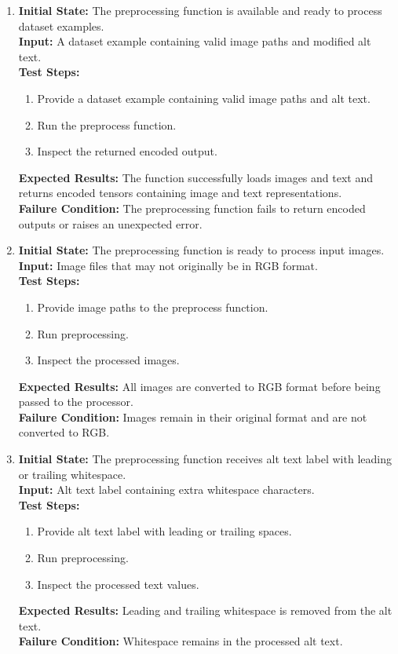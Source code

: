 \documentclass[12pt, titlepage]{article}
\begin{document}
\begin{enumerate}[label=DP-MT \arabic*., wide=0pt, leftmargin=*]
  \item{}
    {\bf Initial State:} The preprocessing function is available and
    ready to process dataset examples. \\
    {\bf Input:} A dataset example containing valid image paths and
    modified alt text. \\
    {\bf Test Steps:}
    \begin{enumerate}
      \item Provide a dataset example containing valid image paths and alt text.
      \item Run the preprocess function.
      \item Inspect the returned encoded output.
    \end{enumerate}
    {\bf Expected Results:} The function successfully loads images
    and text and returns encoded tensors containing image and text
    representations. \\
    {\bf Failure Condition:} The preprocessing function fails to
    return encoded outputs or raises an unexpected error. \\

  \item{}
    {\bf Initial State:} The preprocessing function is ready to
    process input images. \\
    {\bf Input:} Image files that may not originally be in RGB format. \\
    {\bf Test Steps:}
    \begin{enumerate}
      \item Provide image paths to the preprocess function.
      \item Run preprocessing.
      \item Inspect the processed images.
    \end{enumerate}
    {\bf Expected Results:} All images are converted to RGB format
    before being passed to the processor. \\
    {\bf Failure Condition:} Images remain in their original format
    and are not converted to RGB. \\

  \item{}
    {\bf Initial State:} The preprocessing function receives alt text
    label with leading or trailing whitespace. \\
    {\bf Input:} Alt text label containing extra whitespace characters. \\
    {\bf Test Steps:}
    \begin{enumerate}
      \item Provide alt text label with leading or trailing spaces.
      \item Run preprocessing.
      \item Inspect the processed text values.
    \end{enumerate}
    {\bf Expected Results:} Leading and trailing whitespace is
    removed from the alt text. \\
    {\bf Failure Condition:} Whitespace remains in the processed alt text. \\


\end{enumerate}
\end{document}
